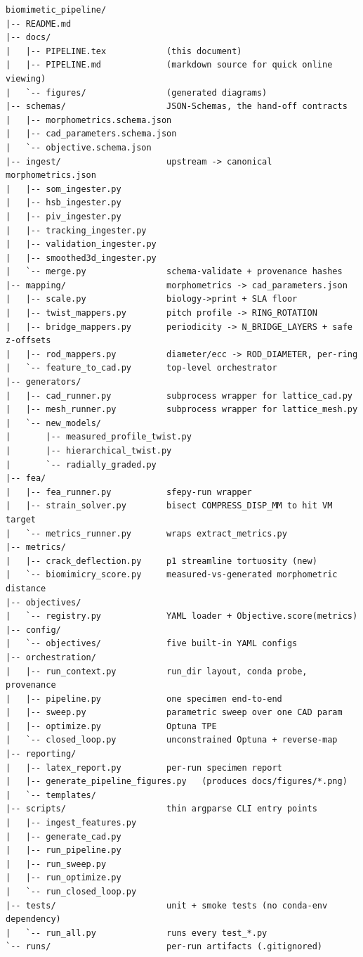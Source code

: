 \documentclass[11pt, letterpaper]{article}
\begin{document}
\begin{lstlisting}
biomimetic_pipeline/
|-- README.md
|-- docs/
|   |-- PIPELINE.tex            (this document)
|   |-- PIPELINE.md             (markdown source for quick online viewing)
|   `-- figures/                (generated diagrams)
|-- schemas/                    JSON-Schemas, the hand-off contracts
|   |-- morphometrics.schema.json
|   |-- cad_parameters.schema.json
|   `-- objective.schema.json
|-- ingest/                     upstream -> canonical morphometrics.json
|   |-- som_ingester.py
|   |-- hsb_ingester.py
|   |-- piv_ingester.py
|   |-- tracking_ingester.py
|   |-- validation_ingester.py
|   |-- smoothed3d_ingester.py
|   `-- merge.py                schema-validate + provenance hashes
|-- mapping/                    morphometrics -> cad_parameters.json
|   |-- scale.py                biology->print + SLA floor
|   |-- twist_mappers.py        pitch profile -> RING_ROTATION
|   |-- bridge_mappers.py       periodicity -> N_BRIDGE_LAYERS + safe z-offsets
|   |-- rod_mappers.py          diameter/ecc -> ROD_DIAMETER, per-ring
|   `-- feature_to_cad.py       top-level orchestrator
|-- generators/
|   |-- cad_runner.py           subprocess wrapper for lattice_cad.py
|   |-- mesh_runner.py          subprocess wrapper for lattice_mesh.py
|   `-- new_models/
|       |-- measured_profile_twist.py
|       |-- hierarchical_twist.py
|       `-- radially_graded.py
|-- fea/
|   |-- fea_runner.py           sfepy-run wrapper
|   |-- strain_solver.py        bisect COMPRESS_DISP_MM to hit VM target
|   `-- metrics_runner.py       wraps extract_metrics.py
|-- metrics/
|   |-- crack_deflection.py     p1 streamline tortuosity (new)
|   `-- biomimicry_score.py     measured-vs-generated morphometric distance
|-- objectives/
|   `-- registry.py             YAML loader + Objective.score(metrics)
|-- config/
|   `-- objectives/             five built-in YAML configs
|-- orchestration/
|   |-- run_context.py          run_dir layout, conda probe, provenance
|   |-- pipeline.py             one specimen end-to-end
|   |-- sweep.py                parametric sweep over one CAD param
|   |-- optimize.py             Optuna TPE
|   `-- closed_loop.py          unconstrained Optuna + reverse-map
|-- reporting/
|   |-- latex_report.py         per-run specimen report
|   |-- generate_pipeline_figures.py   (produces docs/figures/*.png)
|   `-- templates/
|-- scripts/                    thin argparse CLI entry points
|   |-- ingest_features.py
|   |-- generate_cad.py
|   |-- run_pipeline.py
|   |-- run_sweep.py
|   |-- run_optimize.py
|   `-- run_closed_loop.py
|-- tests/                      unit + smoke tests (no conda-env dependency)
|   `-- run_all.py              runs every test_*.py
`-- runs/                       per-run artifacts (.gitignored)
\end{lstlisting}
\end{document}
